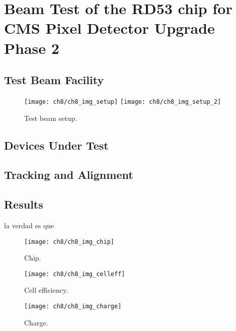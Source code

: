 \chapter{Beam Test of the RD53 chip for CMS Pixel Detector Upgrade Phase 2}\label{ch:testbeam}
\section{Test Beam Facility}
\begin{figure}[!h]
	\centering
	\texttt{[image: ch8/ch8\_img\_setup]}
	\texttt{[image: ch8/ch8\_img\_setup\_2]}
	\caption[Test beam setup] {Test beam setup.}
	\label{ch8imgsetup}
\end{figure}

	


\section{Devices Under Test}
\section{Tracking and Alignment}
\section{Results}


la verdad es que



\begin{figure}[!h]
	\centering
	\texttt{[image: ch8/ch8\_img\_chip]}
	\caption[chip] {Chip.}
	\label{chip}
\end{figure}

\begin{figure}[!h]
	\centering
	\texttt{[image: ch8/ch8\_img\_celleff]}
	\caption[Cell efficiency] {Cell efficiency.}
	\label{celleff}
\end{figure}

\begin{figure}[!h]
	\centering
	\texttt{[image: ch8/ch8\_img\_charge]}
	\caption[Charge] {Charge.}
	\label{charge}
\end{figure}

